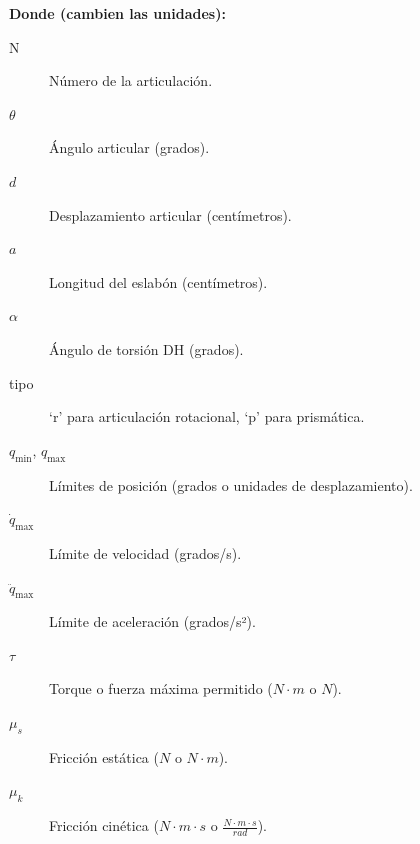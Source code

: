 \bigskip
\noindent
\textbf{Donde (cambien las unidades):}
\begin{description}
	\item[N] Número de la articulación.
	\item[\(\theta\)] Ángulo articular (grados).
	\item[\(d\)] Desplazamiento articular (centímetros).
	\item[\(a\)] Longitud del eslabón (centímetros).
	\item[\(\alpha\)] Ángulo de torsión DH (grados).
	\item[tipo] ‘r’ para articulación rotacional, ‘p’ para prismática.
	\item[\(q_{\min}\), \(q_{\max}\)] Límites de posición (grados o unidades de desplazamiento).
	\item[\(\dot q_{\max}\)] Límite de velocidad (grados/s).
	\item[\(\ddot q_{\max}\)] Límite de aceleración (grados/s²).
	\item[\(\tau\)] Torque o fuerza máxima permitido (\(N \cdot m\) o \(N\)).
	\item[\(\mu_s\)] Fricción estática (\(N\) o \(N \cdot m\)).
	\item[\(\mu_k\)] Fricción cinética (\(N \cdot m \cdot s\) o \(\frac{N \cdot m \cdot s}{rad}\)).
\end{description}

